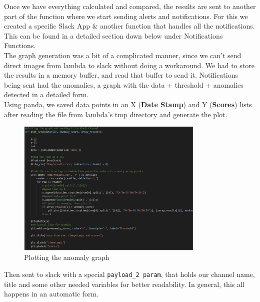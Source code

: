 Once we have everything calculated and compared, the results are sent to another part of the function where we start sending alerts and notifications. For this we created a specific Slack App \& another function that handles all the notifications. This can be found in a detailed section down below under Notifications Functions.\\

The graph generation was a bit of a complicated manner, since we can’t send direct images from lambda to slack without doing a workaround. We had to store the results in a memory buffer, and read that buffer to send it. Notifications being sent had the anomalies, a graph with the data + threshold + anomalies detected in a detailed form.\\

Using panda, we saved data points in an X (\textbf{Date Stamp}) and Y (\textbf{Scores}) lists after reading the file from lambda’s tmp directory and generate the plot.
\begin{figure}[h!]
    \centering
    \includegraphics[width=0.8\textwidth]{images/graph-plotting.png}
    \caption{Plotting the anomaly graph}
    \label{fig:graph_plotting}
\end{figure}
Then sent to slack with a special \verb|payload_2 param|, that holds our channel name, title and some other needed variables for better readability. In general, this all happens in an automatic form.
\newpage